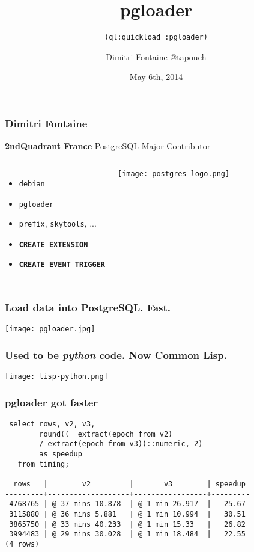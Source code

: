 \documentclass{beamer}
\title{pgloader}
\subtitle{\texttt{(ql:quickload :pgloader)}}
\author{Dimitri Fontaine \linebreak \url{@tapoueh}}
\date{May 6th, 2014}
\begin{document}
\frame{\titlepage}

\begin{frame}[fragile]
  \frametitle{Dimitri Fontaine}

  \begin{center}
    \textbf{2ndQuadrant France}
    \linebreak
    PostgreSQL Major Contributor
  \end{center}
  \vfill

\begin{columns}[c]

  \begin{itemize}
   \item \texttt{debian}
   \item \texttt{pgloader}
   \item \texttt{prefix}, \texttt{skytools}, ...
   \item \texttt{\textbf{CREATE EXTENSION}}
   \item \texttt{\textbf{CREATE EVENT TRIGGER}}
  \end{itemize}  

\begin{center}
  \texttt{[image: postgres-logo.png]}
\end{center}
\end{columns}
\end{frame}

\begin{frame}
  \frametitle{Load data into PostgreSQL. Fast.}


  \begin{center}
    \texttt{[image: pgloader.jpg]}
  \end{center}
\end{frame}

\begin{frame}
  \frametitle{Used to be \textit{python} code. Now Common Lisp.}

  \begin{center}
    \texttt{[image: lisp-python.png]}
  \end{center}
\end{frame}

\begin{frame}[fragile]
  \frametitle{pgloader got faster}

  \begin{verbatim}
 select rows, v2, v3,
        round((  extract(epoch from v2)
        / extract(epoch from v3))::numeric, 2)
        as speedup
   from timing;
        
  rows   |        v2         |       v3        | speedup 
---------+-------------------+-----------------+---------
 4768765 | @ 37 mins 10.878  | @ 1 min 26.917  |   25.67
 3115880 | @ 36 mins 5.881   | @ 1 min 10.994  |   30.51
 3865750 | @ 33 mins 40.233  | @ 1 min 15.33   |   26.82
 3994483 | @ 29 mins 30.028  | @ 1 min 18.484  |   22.55
(4 rows)
  \end{verbatim}
\end{frame}
\end{document}
